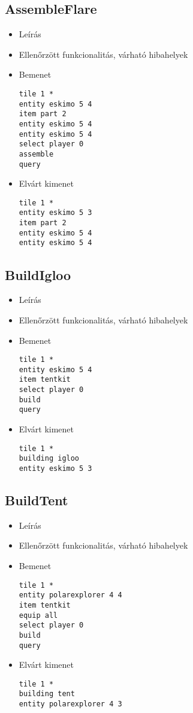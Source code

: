 \subsection{AssembleFlare}
\begin{itemize}
\item Leírás\newline
\item Ellenőrzött funkcionalitás, várható hibahelyek
\item Bemenet
\begin{lstlisting}
tile 1 *
entity eskimo 5 4
item part 2
entity eskimo 5 4
entity eskimo 5 4
select player 0
assemble
query
\end{lstlisting}
\item Elvárt kimenet
\begin{lstlisting}
tile 1 *
entity eskimo 5 3
item part 2
entity eskimo 5 4
entity eskimo 5 4
\end{lstlisting}
\end{itemize}

\subsection{BuildIgloo}
\begin{itemize}
\item Leírás\newline
\item Ellenőrzött funkcionalitás, várható hibahelyek
\item Bemenet
\begin{lstlisting}
tile 1 *
entity eskimo 5 4
item tentkit
select player 0
build
query
\end{lstlisting}
\item Elvárt kimenet
\begin{lstlisting}
tile 1 *
building igloo
entity eskimo 5 3
\end{lstlisting}
\end{itemize}

\subsection{BuildTent}
\begin{itemize}
\item Leírás\newline
\item Ellenőrzött funkcionalitás, várható hibahelyek
\item Bemenet
\begin{lstlisting}
tile 1 *
entity polarexplorer 4 4
item tentkit
equip all
select player 0
build
query
\end{lstlisting}
\item Elvárt kimenet
\begin{lstlisting}
tile 1 *
building tent
entity polarexplorer 4 3
\end{lstlisting}
\end{itemize}


